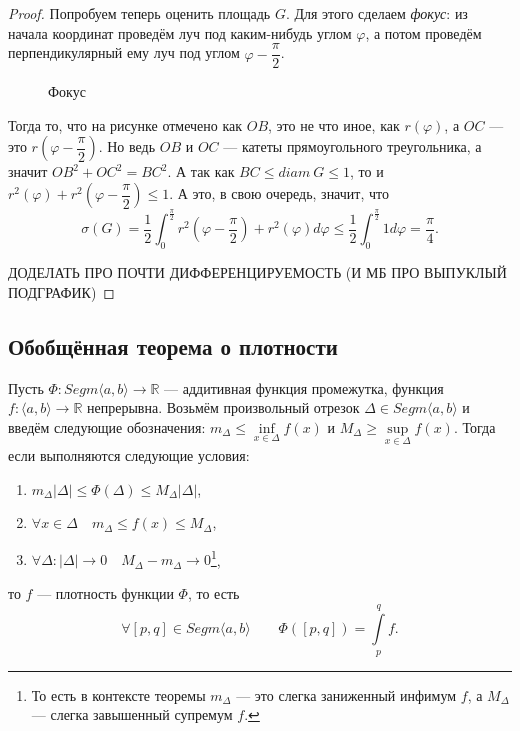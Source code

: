 \begin{proof}
	Попробуем теперь оценить площадь \(G\).	Для этого сделаем \textit{фокус}: из начала координат проведём луч под каким-нибудь углом \(\varphi\), а потом проведём перпендикулярный ему луч под углом \(\varphi - \dfrac{\pi}{2}\).
	\begin{figure}[h!]
		\caption{Фокус}
	\end{figure}
	
	Тогда то, что на рисунке отмечено как \(OB\), это не что иное, как \(r(\varphi)\), а \(OC\) --- это \(r \left(\varphi - \dfrac{\pi}{2} \right)\). Но ведь \(OB\) и \(OC\) --- катеты прямоугольного треугольника, а значит \({OB}^2 + {OC}^2 = {BC}^2\). А так как \(BC \leqslant diam \ G \leqslant 1\), то и \(r^2(\varphi) + r^2 \left(\varphi - \dfrac{\pi}{2} \right) \leqslant 1\). А это, в свою очередь, значит, что \[
	\sigma(G) = \frac{1}{2} \int_{0}^{\frac{\pi}{2}} r^2 \left(\varphi - \frac{\pi}{2} \right) +  r^2(\varphi) d\varphi \leqslant \frac{1}{2} \int_{0}^{\frac{\pi}{2}} 1 d\varphi = \frac{\pi}{4}.
	\]
	
	ДОДЕЛАТЬ ПРО ПОЧТИ ДИФФЕРЕНЦИРУЕМОСТЬ (И МБ ПРО ВЫПУКЛЫЙ ПОДГРАФИК)
\end{proof}

\subsection{Обобщённая теорема о плотности}

\hypertarget{plotn}{}
\begin{theorem}
	Пусть \(\Phi \colon Segm \langle a, b \rangle \to \mathbb{R}\) --- аддитивная функция промежутка, функция \(f \colon \langle a, b \rangle \to \mathbb{R}\) непрерывна. Возьмём произвольный отрезок \(\Delta \in Segm \langle a, b \rangle\) и введём следующие обозначения: \(m_\Delta \leqslant \inf\limits_{x \in \Delta} f(x)\) и \(M_\Delta \geqslant \sup\limits_{x \in \Delta} f(x)\). Тогда если выполняются следующие условия:
	\begin{enumerate}
		\item \label{plotn_1} \(m_\Delta |\Delta| \leqslant \Phi(\Delta) \leqslant M_\Delta |\Delta|\),
		\item \label{plotn_2} \(\forall x \in \Delta \quad m_\Delta \leqslant f(x) \leqslant M_\Delta\),
		\item \label{plotn_3} \(\forall \Delta : |\Delta| \to 0 \quad M_\Delta - m_\Delta \to 0\)\footnote{То есть в контексте теоремы \(m_\Delta\) --- это слегка заниженный инфимум \(f\), а \(M_\Delta\) --- слегка завышенный супремум \(f\).},
	\end{enumerate}
	то \(f\) --- плотность функции \(\Phi\), то есть \[
		\forall [p, q] \in Segm \langle a, b \rangle \qquad \Phi([p, q]) = \int\limits_p^q f.
	\]
\end{theorem}

